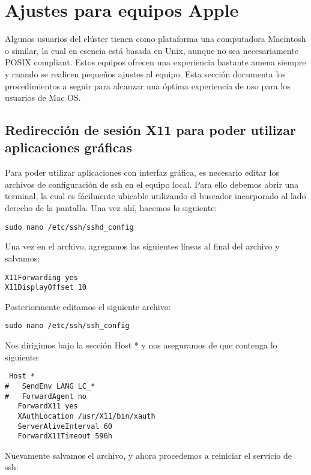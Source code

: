\chapter{Ajustes para equipos Apple}
Algunos usuarios del clúster tienen como plataforma una computadora Macintosh o similar, la cual en esencia está basada en Unix, aunque no sea necesariamente POSIX compliant. Estos equipos ofrecen una experiencia bastante amena siempre y cuando se realicen pequeños ajustes al equipo. Esta sección documenta los procedimientos a seguir para alcanzar una óptima experiencia de uso para los usuarios de Mac OS.

\section{Redirección de sesión X11 para poder utilizar aplicaciones gráficas}

Para poder utilizar aplicaciones con interfaz gráfica, es necesario editar los archivos de configuración de ssh en el equipo local. Para ello debemos abrir una terminal, la cual es fácilmente ubicable utilizando el buscador incorporado al lado derecho de la pantalla. Una vez ahí, hacemos lo siguiente:

\begin{lstlisting}
sudo nano /etc/ssh/sshd_config
\end{lstlisting}

Una vez en el archivo, agregamos las siguientes líneas al final del archivo y salvamos:

\begin{lstlisting}
X11Forwarding yes
X11DisplayOffset 10
\end{lstlisting}

Posteriormente editamos el siguiente archivo:

\begin{lstlisting}
sudo nano /etc/ssh/ssh_config
\end{lstlisting}

Nos dirigimos bajo la sección Host * y nos aseguramos de que contenga lo siguiente:

\begin{lstlisting}
 Host *
#   SendEnv LANG LC_*
#   ForwardAgent no
   ForwardX11 yes
   XAuthLocation /usr/X11/bin/xauth
   ServerAliveInterval 60
   ForwardX11Timeout 596h
\end{lstlisting}

Nuevamente salvamos el archivo, y ahora procedemos a reiniciar el servicio de ssh:

